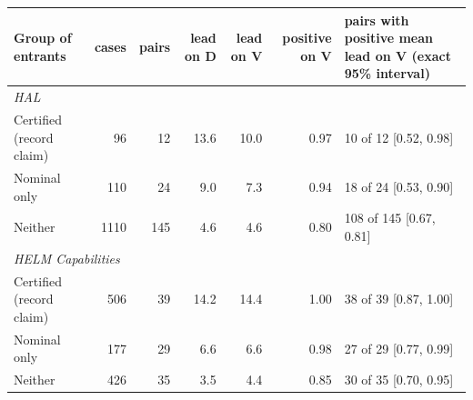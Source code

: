 \begin{tabular}{lrrrrrp{4.2cm}}
\toprule
Group of entrants & cases & pairs & lead on D & lead on V & positive on V & pairs with positive mean lead on V (exact 95\% interval) \\
\midrule
\multicolumn{7}{l}{\emph{HAL}} \\
\quad Certified (record claim) & 96 & 12 & 13.6 & 10.0 & 0.97 & 10 of 12 [0.52, 0.98] \\
\quad Nominal only & 110 & 24 & 9.0 & 7.3 & 0.94 & 18 of 24 [0.53, 0.90] \\
\quad Neither & 1110 & 145 & 4.6 & 4.6 & 0.80 & 108 of 145 [0.67, 0.81] \\
\midrule
\multicolumn{7}{l}{\emph{HELM Capabilities}} \\
\quad Certified (record claim) & 506 & 39 & 14.2 & 14.4 & 1.00 & 38 of 39 [0.87, 1.00] \\
\quad Nominal only & 177 & 29 & 6.6 & 6.6 & 0.98 & 27 of 29 [0.77, 0.99] \\
\quad Neither & 426 & 35 & 3.5 & 4.4 & 0.85 & 30 of 35 [0.70, 0.95] \\
\bottomrule
\end{tabular}
